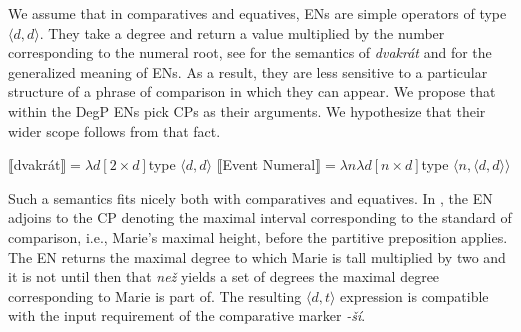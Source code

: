 \documentclass[output=paper,
modfonts,
hidelinks,
newtxmath
]{langscibook}
\begin{document}
\noindent We assume that in comparatives and equatives, ENs are simple operators of type $\langle d,d\rangle$. They take a degree and return a value multiplied by the number corresponding to the numeral root, see  for the semantics of \textit{dvakrát} and  for the generalized meaning of ENs. As a result, they are less sensitive to a particular structure of a phrase of comparison in which they can appear. We propose that within the DegP ENs pick CPs as their arguments. We hypothesize that their wider scope follows from that fact.

\ea \ea $\llbracket$dvakrát$\rrbracket = \lambda d[2 \times d]$\hfill type $\langle d,d\rangle$\label{event-num-semantics-dvakrat}
\ex $\llbracket$Event Numeral$\rrbracket = \lambda n\lambda d[n \times d]$\hfill type $\langle n,\langle d,d\rangle\rangle$\label{event-num-semantics-abstract}
\z \z

\noindent Such a semantics fits nicely both with comparatives and equatives. In , the EN adjoins to the CP denoting the maximal interval corresponding to the standard of comparison, i.e., Marie's maximal height, before the partitive preposition applies. The EN returns the maximal degree to which Marie is tall multiplied by two and it is not until then that \textit{než} yields a set of degrees the maximal degree corresponding to Marie is part of. The resulting $\langle d,t\rangle$ expression is compatible with the input requirement of the comparative marker \textit{-ší}. 

\begin{exe} \ex \label{tree-comp-dvakrat} 
\end{exe}
\end{document}
